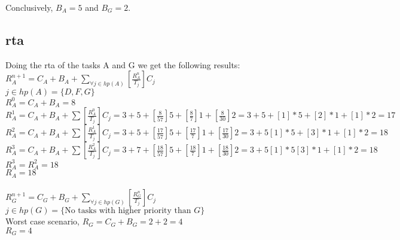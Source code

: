     Conclusively, $B_A = 5$ and $B_G = 2$.\\

\subsection{\textbf{\ac{rta}}}
    Doing the \ac{rta} of the tasks A and G we get the following results:\\
    $R_A^{n+1} = C_A + B_A + \sum\limits_{\forall j \in hp(A)} \left[\frac{R_A^n}{T_j}\right] C_j$\\
    $j \in hp(A) = \{D, F, G\}$\\
    $R_A^0 = C_A + B_A = 8$ \\
    $R_A^{1} = C_A + B_A + \sum \left[\frac{R_A^0}{T_j}\right] C_j = 3 + 5 + \left[\frac{8}{57}\right]5 + \left[\frac{8}{7}\right]1 + \left[\frac{8}{30}\right]2 = 3 + 5 + [1]*5 + [2]*1 + [1]*2 = 17$\\
    $R_A^{2} = C_A + B_A + \sum \left[\frac{R_A^1}{T_j}\right] C_j = 3 + 5 + \left[\frac{17}{57}\right]5 + \left[\frac{17}{7}\right]1 + \left[\frac{17}{30}\right]2 = 3 + 5 [1]*5 + [3]*1 + [1]*2 = 18$\\
    $R_A^{3} = C_A + B_A + \sum \left[\frac{R_A^2}{T_j}\right] C_j = 3 + 7 + \left[\frac{18}{57}\right]5 + \left[\frac{18}{7}\right]1 + \left[\frac{18}{30}\right]2 = 3 + 5 [1]*5 [3]*1 + [1]*2 = 18$\\
    $R_A^3 = R_A^2 = 18$\\

    $R_A = 18$\\
    \\$R_G^{n+1} = C_G + B_G + \sum\limits_{\forall j \in hp(G)} \left[\frac{R_G^n}{T_j}\right] C_j$\\
    $j \in hp(G) = \{\text{No tasks with higher priority than }G\}$\\
    Worst case scenario, $R_G = C_G + B_G = 2 + 2 = 4$\\

    $R_G = 4$\\